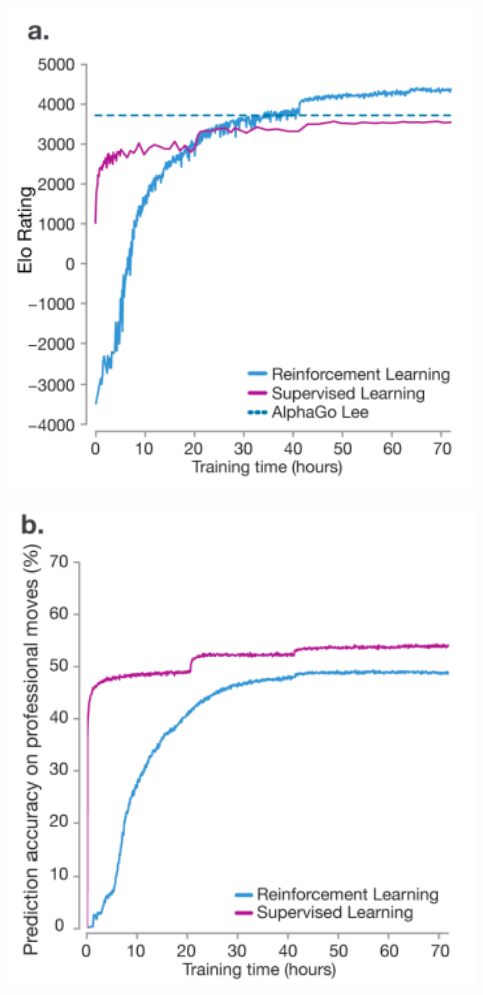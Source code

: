 {\centerline{\includegraphics[height = 5in]{../images/alphalearning1}}


\centerline{\includegraphics[height = 5in]{../images/alphalearning2}}

}
